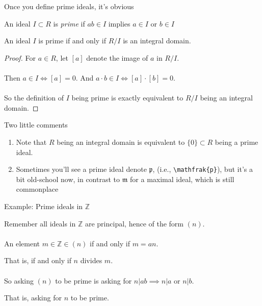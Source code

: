 \documentclass{beamer}
\begin{document}
\begin{frame}{Once you define prime ideals, it's obvious}
\begin{definition}
An ideal $I\subset R$ is \emph{prime} if $ab\in I$ implies $a\in I$ or $b\in I$
\end{definition}

\begin{lemma}
An ideal $I$ is prime if and only if $R/I$ is an integral domain.
\end{lemma}

\begin{proof}
For $a\in R$, let $[a]$ denote the image of $a$ in $R/I$. \\~\\

Then $a\in I\iff [a]=0$.  And $ a\cdot b\in I\iff [a]\cdot [b]=0$.  \\~\\

So the definition of $I$ being prime is exactly equivalent to $R/I$ being an integral domain.

\end{proof}


\end{frame}


\begin{frame}{Two little comments}

\begin{enumerate}
\item 
Note that $R$ being an integral domain is equivalent to $\{0\}\subset R$ being a prime ideal.

\item Sometimes you'll see a prime ideal denote $\mathfrak{p}$, (i.e., {\tt \textbackslash mathfrak\{p\}}), but it's a bit old-school now, in contrast to $\mathfrak{m}$ for a maximal ideal, which is still commonplace

\end{enumerate}

\end{frame}

\begin{frame}{Example: Prime ideals in $\mathbb{Z}$}

Remember all ideals in $\mathbb{Z}$ are principal, hence of the form $(n)$. \\~\\

An element $m\in\mathbb{Z}\in (n)$ if and only if $m=an$.
 
That is, if and only if $n$ divides $m$. \\~\\

So asking $(n)$ to be prime is asking for $n|ab\implies n|a$ or $n|b$.

 That is, asking for $n$ to be prime.


\end{frame}
\end{document}
